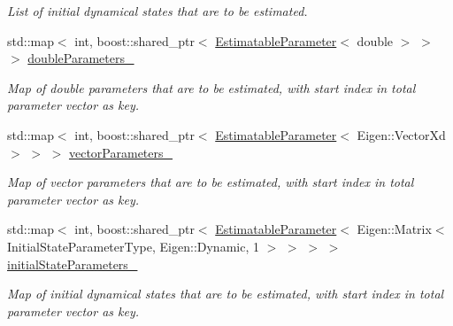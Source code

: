 \begin{DoxyCompactItemize}
\begin{DoxyCompactList}\small\item\em List of initial dynamical states that are to be estimated. \end{DoxyCompactList}\item 
std\+::map$<$ int, boost\+::shared\+\_\+ptr$<$ \hyperlink{classtudat_1_1estimatable__parameters_1_1EstimatableParameter}{Estimatable\+Parameter}$<$ double $>$ $>$ $>$ \hyperlink{classtudat_1_1estimatable__parameters_1_1EstimatableParameterSet_aac3a09c6c22df4228fad3d7c9ad43d9d}{double\+Parameters\+\_\+}\hypertarget{classtudat_1_1estimatable__parameters_1_1EstimatableParameterSet_aac3a09c6c22df4228fad3d7c9ad43d9d}{}\label{classtudat_1_1estimatable__parameters_1_1EstimatableParameterSet_aac3a09c6c22df4228fad3d7c9ad43d9d}

\begin{DoxyCompactList}\small\item\em Map of double parameters that are to be estimated, with start index in total parameter vector as key. \end{DoxyCompactList}\item 
std\+::map$<$ int, boost\+::shared\+\_\+ptr$<$ \hyperlink{classtudat_1_1estimatable__parameters_1_1EstimatableParameter}{Estimatable\+Parameter}$<$ Eigen\+::\+Vector\+Xd $>$ $>$ $>$ \hyperlink{classtudat_1_1estimatable__parameters_1_1EstimatableParameterSet_afdbd058b3d0951732b6a54170c8142ed}{vector\+Parameters\+\_\+}\hypertarget{classtudat_1_1estimatable__parameters_1_1EstimatableParameterSet_afdbd058b3d0951732b6a54170c8142ed}{}\label{classtudat_1_1estimatable__parameters_1_1EstimatableParameterSet_afdbd058b3d0951732b6a54170c8142ed}

\begin{DoxyCompactList}\small\item\em Map of vector parameters that are to be estimated, with start index in total parameter vector as key. \end{DoxyCompactList}\item 
std\+::map$<$ int, boost\+::shared\+\_\+ptr$<$ \hyperlink{classtudat_1_1estimatable__parameters_1_1EstimatableParameter}{Estimatable\+Parameter}$<$ Eigen\+::\+Matrix$<$ Initial\+State\+Parameter\+Type, Eigen\+::\+Dynamic, 1 $>$ $>$ $>$ $>$ \hyperlink{classtudat_1_1estimatable__parameters_1_1EstimatableParameterSet_ac3fde65a460064045e302b10d626e371}{initial\+State\+Parameters\+\_\+}\hypertarget{classtudat_1_1estimatable__parameters_1_1EstimatableParameterSet_ac3fde65a460064045e302b10d626e371}{}\label{classtudat_1_1estimatable__parameters_1_1EstimatableParameterSet_ac3fde65a460064045e302b10d626e371}

\begin{DoxyCompactList}\small\item\em Map of initial dynamical states that are to be estimated, with start index in total parameter vector as key. \end{DoxyCompactList}\end{DoxyCompactItemize}


